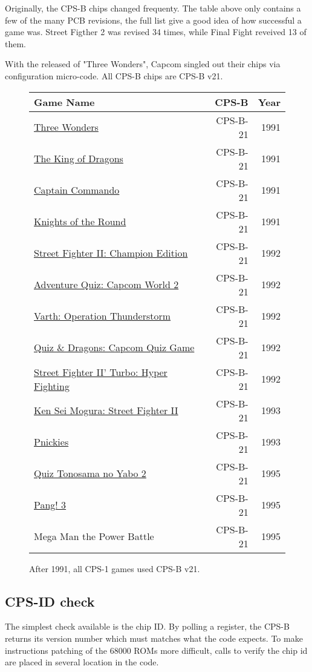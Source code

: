 Originally, the CPS-B chips changed frequenty. The table above only contains a few of the many PCB revisions, the full list give a good idea of how successful a game was. Street Figther 2 was revised 34 times, while Final Fight reveived 13 of them.

With the released of "Three Wonders", Capcom singled out their chips via configuration micro-code. All CPS-B chips are CPS-B v21.

\begin{figure}[H]
{ \setlength{\tabcolsep}{3.0pt}
\begin{tabularx}{\textwidth}{Xrr} 
  \textbf{Game Name} & \textbf{ CPS-B }  & \textbf{ Year } \\               
  \toprule    
\href{}{Three Wonders} &  CPS-B-21 & 1991 \\ 
\href{}{The King of Dragons} & CPS-B-21 & 1991 \\ 
\href{}{Captain Commando} &  CPS-B-21 & 1991 \\ 
\href{}{Knights of the Round} & CPS-B-21 & 1991 \\ 
  \toprule    
\href{}{Street Fighter II: Champion Edition} & CPS-B-21 & 1992 \\ 
\href{}{Adventure Quiz: Capcom World 2} & CPS-B-21 & 1992 \\ 
\href{}{Varth: Operation Thunderstorm} & CPS-B-21 & 1992 \\ 
\href{}{Quiz \& Dragons: Capcom Quiz Game} & CPS-B-21 & 1992 \\ 
\href{}{Street Fighter II' Turbo: Hyper Fighting} &  CPS-B-21 & 1992 \\ 
  \toprule    
\href{}{Ken Sei Mogura: Street Fighter II} & CPS-B-21 & 1993 \\ 
\href{}{Pnickies} & CPS-B-21 & 1993 \\ 
  \toprule    
\href{}{Quiz Tonosama no Yabo 2} &  CPS-B-21 & 1995 \\ 
\href{}{Pang! 3} & CPS-B-21  & 1995 \\ 
Mega Man the Power Battle & CPS-B-21  & 1995 \\

\toprule    
\end{tabularx}%
}\caption*{After 1991, all CPS-1 games used CPS-B v21.}
\end{figure}


\subsection{CPS-ID check}
The simplest check available is the chip ID. By polling a register, the CPS-B returns its version number which must matches what the code expects. To make instructions patching of the 68000 ROMs more difficult, calls to verify the chip id are placed in several location in the code.

